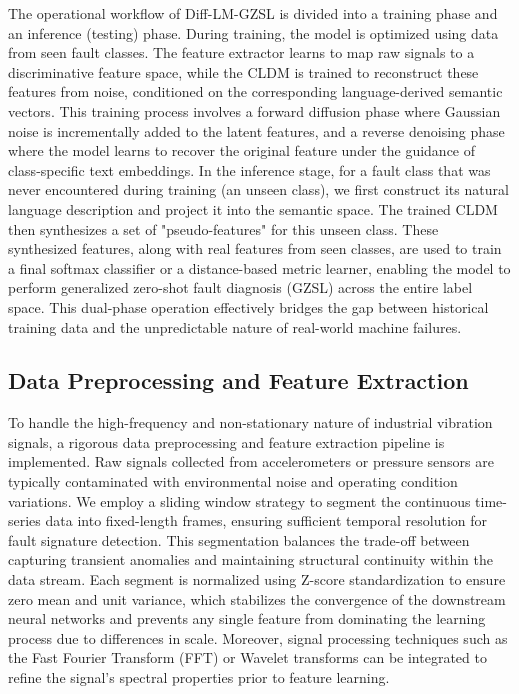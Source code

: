 The operational workflow of Diff-LM-GZSL is divided into a training phase and an inference (testing) phase. During training, the model is optimized using data from seen fault classes. The feature extractor learns to map raw signals to a discriminative feature space, while the CLDM is trained to reconstruct these features from noise, conditioned on the corresponding language-derived semantic vectors. This training process involves a forward diffusion phase where Gaussian noise is incrementally added to the latent features, and a reverse denoising phase where the model learns to recover the original feature under the guidance of class-specific text embeddings. In the inference stage, for a fault class that was never encountered during training (an unseen class), we first construct its natural language description and project it into the semantic space. The trained CLDM then synthesizes a set of "pseudo-features" for this unseen class. These synthesized features, along with real features from seen classes, are used to train a final softmax classifier or a distance-based metric learner, enabling the model to perform generalized zero-shot fault diagnosis (GZSL) across the entire label space. This dual-phase operation effectively bridges the gap between historical training data and the unpredictable nature of real-world machine failures.

\subsection{Data Preprocessing and Feature Extraction}
\label{sec:preprocessing}
To handle the high-frequency and non-stationary nature of industrial vibration signals, a rigorous data preprocessing and feature extraction pipeline is implemented. Raw signals collected from accelerometers or pressure sensors are typically contaminated with environmental noise and operating condition variations. We employ a sliding window strategy to segment the continuous time-series data into fixed-length frames, ensuring sufficient temporal resolution for fault signature detection. This segmentation balances the trade-off between capturing transient anomalies and maintaining structural continuity within the data stream. Each segment is normalized using Z-score standardization to ensure zero mean and unit variance, which stabilizes the convergence of the downstream neural networks and prevents any single feature from dominating the learning process due to differences in scale. Moreover, signal processing techniques such as the Fast Fourier Transform (FFT) or Wavelet transforms can be integrated to refine the signal's spectral properties prior to feature learning.

